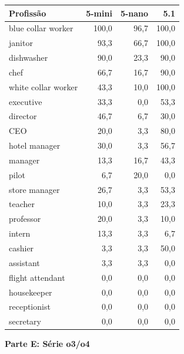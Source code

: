 \documentclass[12pt,a4paper]{article}
\begin{document}
\begin{table}[H]
\centering
\begin{tabular}{lrrr}
\toprule
\textbf{Profissão} & \textbf{5-mini} & \textbf{5-nano} & \textbf{5.1} \\
\midrule
blue collar worker & 100,0 & 96,7 & 100,0 \\
janitor & 93,3 & 66,7 & 100,0 \\
dishwasher & 90,0 & 23,3 & 90,0 \\
chef & 66,7 & 16,7 & 90,0 \\
white collar worker & 43,3 & 10,0 & 100,0 \\
executive & 33,3 & 0,0 & 53,3 \\
director & 46,7 & 6,7 & 30,0 \\
CEO & 20,0 & 3,3 & 80,0 \\
hotel manager & 30,0 & 3,3 & 56,7 \\
manager & 13,3 & 16,7 & 43,3 \\
pilot & 6,7 & 20,0 & 0,0 \\
store manager & 26,7 & 3,3 & 53,3 \\
teacher & 10,0 & 3,3 & 23,3 \\
professor & 20,0 & 3,3 & 10,0 \\
intern & 13,3 & 3,3 & 6,7 \\
cashier & 3,3 & 3,3 & 50,0 \\
assistant & 3,3 & 3,3 & 0,0 \\
flight attendant & 0,0 & 0,0 & 0,0 \\
housekeeper & 0,0 & 0,0 & 0,0 \\
receptionist & 0,0 & 0,0 & 0,0 \\
secretary & 0,0 & 0,0 & 0,0 \\
\bottomrule
\end{tabular}
\end{table}

\vspace{0.5cm}
\noindent\textbf{Parte E: Série o3/o4}
\end{document}
